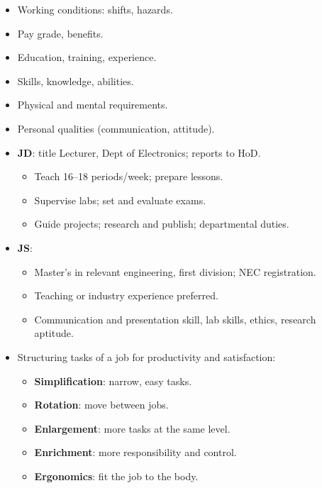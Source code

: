 {\begin{itemize}
  \item Working conditions: shifts, hazards.
  \item Pay grade, benefits.
\end{itemize}
\begin{itemize}
  \item Education, training, experience.
  \item Skills, knowledge, abilities.
  \item Physical and mental requirements.
  \item Personal qualities (communication, attitude).
\end{itemize}
{\small
\begin{itemize}
  \item \textbf{JD}: title Lecturer, Dept of Electronics; reports to HoD.
  \begin{itemize}
    \item Teach 16--18 periods/week; prepare lessons.
    \item Supervise labs; set and evaluate exams.
    \item Guide projects; research and publish; departmental duties.
  \end{itemize}
  \item \textbf{JS}:
  \begin{itemize}
    \item Master's in relevant engineering, first division; NEC registration.
    \item Teaching or industry experience preferred.
    \item Communication and presentation skill, lab skills, ethics, research aptitude.
  \end{itemize}
\end{itemize}}
\begin{itemize}
  \item Structuring tasks of a job for productivity and satisfaction:
  \begin{itemize}
    \item \textbf{Simplification}: narrow, easy tasks.
    \item \textbf{Rotation}: move between jobs.
    \item \textbf{Enlargement}: more tasks at the same level.
    \item \textbf{Enrichment}: more responsibility and control.
    \item \textbf{Ergonomics}: fit the job to the body.
  \end{itemize}
\end{itemize}}

